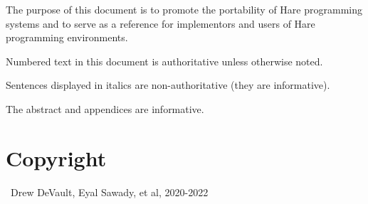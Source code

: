 
\specitem
The purpose of this document is to promote the portability of Hare programming
systems and to serve as a reference for implementors and users of Hare
programming environments.

\specitem
Numbered text in this document is authoritative unless otherwise noted.

\specitem
Sentences displayed in italics are non-authoritative (they are informative).


\specitem
The abstract and appendices are informative.

\section{Copyright}

\textcopyright\ Drew DeVault, Eyal Sawady, et al, 2020-2022

